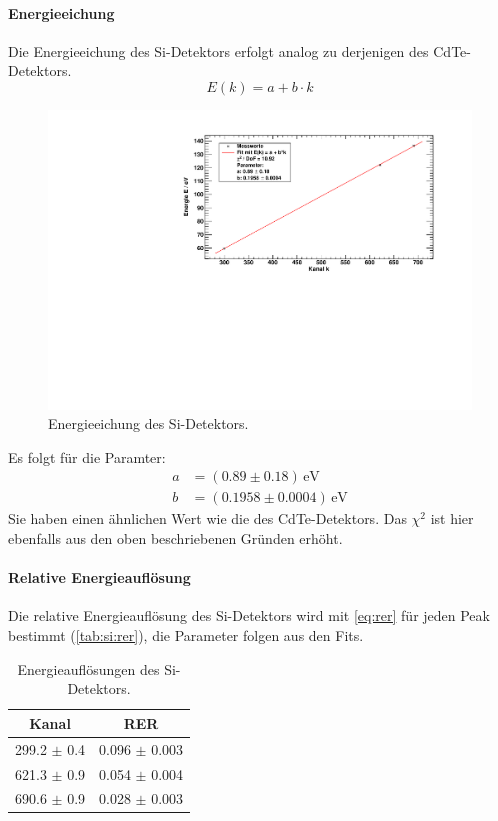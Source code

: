 \paragraph{Energieeichung}
Die Energieeichung des Si-Detektors erfolgt analog zu derjenigen des CdTe-Detektors.
\begin{equation}
    E(k) = a + b\cdot k
\end{equation}
\begin{figure}[H]
\begin{center}
  \includegraphics[width=\textwidth]{../img/part3/energygauge_Si.pdf}
  \caption{Energieeichung des Si-Detektors.}
  \label{img:si:energygauge}
\end{center}
\end{figure}
Es folgt für die Paramter:
\begin{equation}
\begin{split}
  a &= (0.89 \pm 0.18)\,\text{eV} \\
  b &= (0.1958 \pm 0.0004)\,\text{eV}
\end{split}
\end{equation}
Sie haben einen ähnlichen Wert wie die des CdTe-Detektors. 
Das $\chi^2$ ist hier ebenfalls aus den oben beschriebenen Gründen erhöht.

\paragraph{Relative Energieauflösung}
Die relative Energieauflösung des Si-Detektors wird mit \autoref{eq:rer} für jeden Peak bestimmt (\autoref{tab:si:rer}), 
die Parameter folgen aus den Fits.
\begin{table}[H]
\begin{center}
\begin{tabular}{|c|c|}
\hline 
Kanal & RER \\ \hline
299.2 $\pm$ 0.4 & 0.096 $\pm$ 0.003 \\ \hline
621.3 $\pm$ 0.9 & 0.054 $\pm$ 0.004 \\ \hline
690.6 $\pm$ 0.9 & 0.028 $\pm$ 0.003 \\ \hline
\end{tabular}
\caption{Energieauflösungen des Si-Detektors.}
\label{tab:si:rer}
\end{center}
\end{table}

